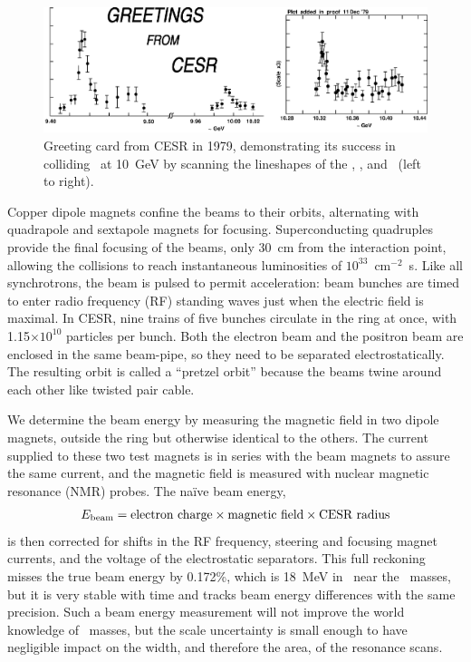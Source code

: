 \documentclass{cornell}
\begin{document}
\begin{figure}[p]
  \begin{center}
    \includegraphics[width=\linewidth]{greetingsfromcesr}
  \end{center}
  \caption[First scan of \ups\ resonances by CESR in
  1979]{\label{greetingsfromcesr} Greeting card from CESR in 1979,
  demonstrating its success in colliding \ee\ at 10~GeV by scanning
  the lineshapes of the \us, \uss, and \usss\ (left to right).}
\end{figure}

Copper dipole magnets confine the beams to their orbits, alternating
with quadrapole and sextapole magnets for focusing.  Superconducting
quadruples provide the final focusing of the beams, only 30~cm from
the interaction point, allowing the collisions to reach instantaneous
luminosities of $10^{33}$~cm$^{-2}$~s\inv.  Like all synchrotrons, the
beam is pulsed to permit acceleration: beam bunches are timed to enter
radio frequency (RF) standing waves just when the electric field is
maximal.  In CESR, nine trains of five bunches circulate in the ring
at once, with 1.15$\times 10^{10}$ particles per bunch.  Both the
electron beam and the positron beam are enclosed in the same
beam-pipe, so they need to be separated electrostatically.  The
resulting orbit is called a ``pretzel orbit'' because the beams twine
around each other like twisted pair cable.

We determine the beam energy by measuring the magnetic field in two
dipole magnets, outside the ring but otherwise identical to the
others.  The current supplied to these two test magnets is in series
with the beam magnets to assure the same current, and the magnetic
field is measured with nuclear magnetic resonance (NMR) probes.  The
na\"ive beam energy,
\begin{equation}
  E_{\mbox{\scriptsize beam}} = \mbox{electron charge} \times \mbox{magnetic field}
  \times \mbox{CESR radius}
\end{equation}
is then corrected for shifts in the RF frequency, steering and
focusing magnet currents, and the voltage of the electrostatic
separators.  This full reckoning misses the true beam energy by
0.172\%, which is 18~MeV in \ecm\ near the \ups\ masses, but it is
very stable with time and tracks beam energy differences with the same
precision.  Such a beam energy measurement will not improve the world
knowledge of \ups\ masses, but the scale uncertainty is small enough
to have negligible impact on the width, and therefore the area, of the
resonance scans.
\end{document}

